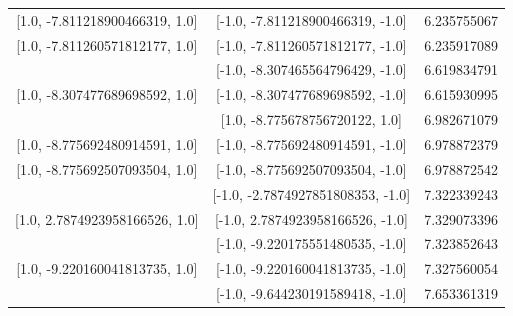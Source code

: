 \documentclass[aps]{revtex4-2}
\begin{document}
\begin{center}
\begin{tabular}{||c c c||}
        [1.0, -7.811218900466319, 1.0]&[-1.0, -7.811218900466319, -1.0]&6.235755067\\

        [1.0, -7.811260571812177, 1.0]&[-1.0, -7.811260571812177, -1.0]&6.235917089\\
        \hline
        [1.0, -8.307465564796429, 1.0]&[-1.0, -8.307465564796429, -1.0]&6.619834791\\

        [1.0, -8.307477689698592, 1.0]&[-1.0, -8.307477689698592, -1.0]&6.615930995\\
        \hline
        [1.0, -8.775678756720122, 1.0]&[1.0, -8.775678756720122, 1.0]&6.982671079\\

        [1.0, -8.775692480914591, 1.0]&[-1.0, -8.775692480914591, -1.0]&6.978872379\\

        [1.0, -8.775692507093504, 1.0]&[-1.0, -8.775692507093504, -1.0]&6.978872542\\
        \hline
        [1.0, -2.7874927851808353, 1.0]&[-1.0, -2.7874927851808353, -1.0]&7.322339243\\

        [1.0, 2.7874923958166526, 1.0]&[-1.0, 2.7874923958166526, -1.0]&7.329073396\\
        \hline
        [1.0, -9.220175551480535, 1.0]&[-1.0, -9.220175551480535, -1.0]&7.323852643\\

        [1.0, -9.220160041813735, 1.0]&[-1.0, -9.220160041813735, -1.0]&7.327560054\\
        \hline
        [1.0, -9.644230191589418, 1.0]&[-1.0, -9.644230191589418, -1.0]&7.653361319\\
        \hline
    \end{tabular}
\end{center}
\end{document}
